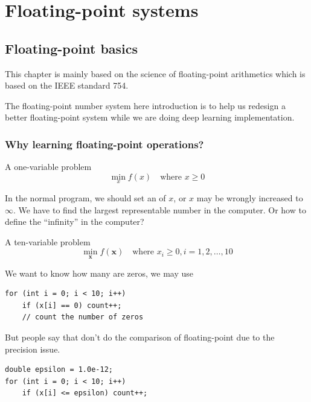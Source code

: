 \setcounter{chapter}{0}
\chapter{Floating-point systems}
\section{Floating-point basics}

This chapter is mainly based on the science of floating-point arithmetics which is based on the IEEE standard 754.

\begin{remark}
    The floating-point number system here introduction is to help us redesign a better floating-point system while we are doing deep learning implementation.
\end{remark}

\subsection{Why learning floating-point operations?}

\begin{eg}
    A one-variable problem
    \[
        \min_{x} f(x) \quad \text{where } x \geq 0
    \]
\end{eg}

In the normal program, we should set an  of $x$, or $x$ may be wrongly increased to $\infty$. We have to find the largest representable number in the computer. Or how to define the ``infinity'' in the computer?

\begin{eg}
    A ten-variable problem
    \[
        \min_{\mathbf{x}} f(\mathbf{x}) \quad \text{where } x_i \geq 0, i=1,2,\ldots,10
    \]
\end{eg}

We want to know how many are zeros, we may use 
\begin{verbatim}
for (int i = 0; i < 10; i++)
    if (x[i] == 0) count++;
    // count the number of zeros
\end{verbatim}

But people say that don't do the comparison of floating-point due to the precision issue.
\begin{verbatim}
double epsilon = 1.0e-12;
for (int i = 0; i < 10; i++)
    if (x[i] <= epsilon) count++;
\end{verbatim}

